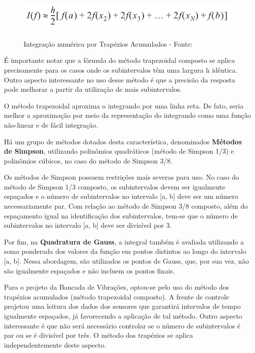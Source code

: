 \begin{figure}[H]
\centering
\includegraphics[keepaspectratio=true,scale=0.52]	{figuras/metodo_trapezoidal.png}
\label{fig:metodo_trapezoidal}
\caption{Integração numérica por Trapézios Acumulados - Fonte: }
\end{figure}

É importante notar que a fórmula do método trapezoidal composto se aplica precisamente para os casos onde os subintervalos têm uma largura h
idêntica. Outro aspecto interessante no uso desse método é que a precisão da resposta pode melhorar a partir da utilização de mais subintervalos.

O método trapezoidal aproxima o integrando por uma linha reta. De fato, seria melhor a aproximação por meio da representação do integrando 
como uma função não-linear e de fácil integração.

Há um grupo de métodos dotados desta característica, denominados \textbf{Métodos de Simpson}, utilizando polinômios quadráticos (método de
Simpson 1/3) e polinômios cúbicos, no caso do método de Simpson 3/8.

Os métodos de Simpson possuem restrições mais severas para uso. No caso do método de Simpson 1/3 composto, os subintervalos devem ser 
igualmente espaçados e o número de subintervalos no intervalo [a, b] deve ser um número necessariamente par. Com relação ao método de Simpson 
3/8 composto, além do espaçamento igual na identificação dos subintervalos, tem-se que o número de subintervalos no intervalo [a, b] deve ser 
divisível por 3.

Por fim, na \textbf{Quadratura de Gauss}, a integral também é avaliada utilizando a soma ponderada dos valores da função em pontos distintos 
ao longo do intervalo [a, b]. Nessa abordagem, são utilizados os pontos de Gauss, que, por sua vez, não são igualmente espaçados e não incluem 
os pontos finais.

Para o projeto da Bancada de Vibrações, optou-se pelo uso do método dos trapézios acumulados (método trapezoidal composto). A frente de 
controle projetou uma leitura dos dados dos sensores que garantirá intervalos de tempo igualmente espaçados, já favorecendo a aplicação de 
tal método. Outro aspecto interessante é que não será necessário controlar se o número de subintervalos é par ou se é divisível por três. 
O método dos trapézios se aplica independentemente deste aspecto.

